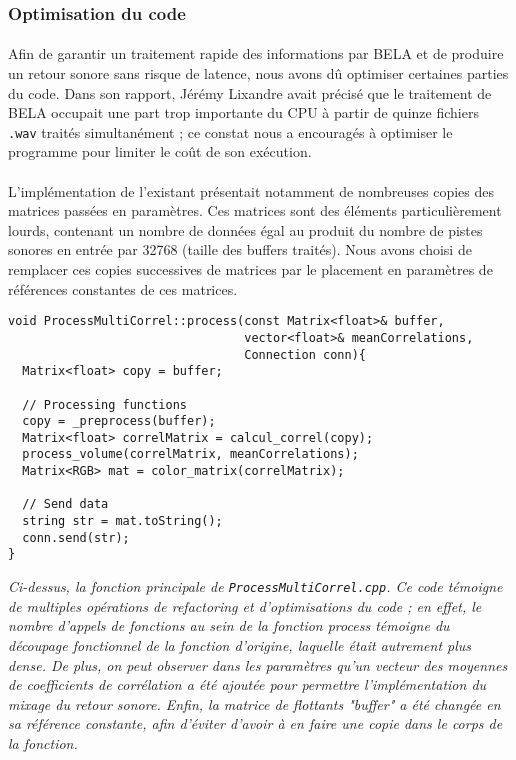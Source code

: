 \subsubsection{Optimisation du code}
\paragraph{}
Afin de garantir un traitement rapide des informations par BELA et de
produire un retour sonore sans risque de latence, nous avons dû
optimiser certaines parties du code. Dans son rapport, Jérémy Lixandre
avait précisé que le traitement de BELA occupait une part trop
importante du CPU à partir de quinze fichiers \verb!.wav! traités
simultanément ; ce constat nous a encouragés à optimiser le programme
pour limiter le coût de son exécution.
\paragraph{}
L'implémentation de l'existant présentait notamment de nombreuses
copies des matrices passées en paramètres. Ces matrices sont des
éléments particulièrement lourds, contenant un nombre de données égal
au produit du nombre de pistes sonores en entrée par 32768 (taille des
buffers traités). Nous avons choisi de remplacer ces copies
successives de matrices par le placement en paramètres de références
constantes de ces matrices.

\begin{lstlisting}
void ProcessMultiCorrel::process(const Matrix<float>& buffer,
                                 vector<float>& meanCorrelations,
                                 Connection conn){
  Matrix<float> copy = buffer;

  // Processing functions
  copy = _preprocess(buffer);
  Matrix<float> correlMatrix = calcul_correl(copy);
  process_volume(correlMatrix, meanCorrelations);
  Matrix<RGB> mat = color_matrix(correlMatrix);

  // Send data
  string str = mat.toString();
  conn.send(str);
}
\end{lstlisting}
\begin{center}
  \textit{Ci-dessus, la fonction principale de
    \verb!ProcessMultiCorrel.cpp!. Ce code témoigne de multiples
    opérations de refactoring et d'optimisations du code ; en effet,
    le nombre d'appels de fonctions au sein de la fonction process témoigne du
    découpage fonctionnel de la fonction d'origine, laquelle était autrement
    plus dense. De plus, on peut observer dans les paramètres qu'un
    vecteur des moyennes de coefficients de corrélation a été ajoutée
    pour permettre l'implémentation du mixage du retour sonore. Enfin,
    la matrice de flottants "buffer" a été changée en sa référence
    constante, afin d'éviter d'avoir à en faire une copie dans le
    corps de la fonction.}
  \end{center}

